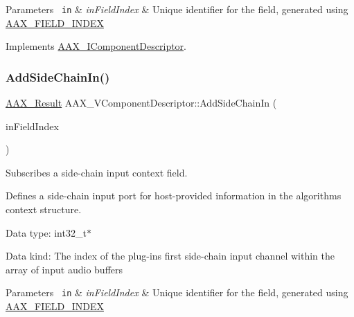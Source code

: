 \begin{DoxyParams}[1]{Parameters}
\mbox{\texttt{ in}}  & {\em in\+Field\+Index} & Unique identifier for the field, generated using \mbox{\hyperlink{a00392_acf807247ecd6e5899dc9dc31644e9a1d}{A\+A\+X\+\_\+\+F\+I\+E\+L\+D\+\_\+\+I\+N\+D\+EX}} \\
\hline
\end{DoxyParams}


Implements \mbox{\hyperlink{a01781_a59727dee1043fcd7f14da130ab254445}{A\+A\+X\+\_\+\+I\+Component\+Descriptor}}.

\mbox{\label{a01901_a9d3ad428d0b423e4aabba60eb76655c7}} 
\subsubsection{\texorpdfstring{AddSideChainIn()}{AddSideChainIn()}}
{\footnotesize\ttfamily \mbox{\hyperlink{a00392_a4d8f69a697df7f70c3a8e9b8ee130d2f}{A\+A\+X\+\_\+\+Result}} A\+A\+X\+\_\+\+V\+Component\+Descriptor\+::\+Add\+Side\+Chain\+In (\begin{DoxyParamCaption}\item[{\mbox{\hyperlink{a00392_ae807f8986143820cfb5d6da32165c9c7}{A\+A\+X\+\_\+\+C\+Field\+Index}}}]{in\+Field\+Index }\end{DoxyParamCaption})\hspace{0.3cm}{\ttfamily [virtual]}}



Subscribes a side-\/chain input context field. 

Defines a side-\/chain input port for host-\/provided information in the algorithm\textquotesingle{}s context structure.


\begin{DoxyItemize}
\item Data type\+: int32\+\_\+t$\ast$
\item Data kind\+: The index of the plug-\/in\textquotesingle{}s first side-\/chain input channel within the array of input audio buffers
\end{DoxyItemize}


\begin{DoxyParams}[1]{Parameters}
\mbox{\texttt{ in}}  & {\em in\+Field\+Index} & Unique identifier for the field, generated using \mbox{\hyperlink{a00392_acf807247ecd6e5899dc9dc31644e9a1d}{A\+A\+X\+\_\+\+F\+I\+E\+L\+D\+\_\+\+I\+N\+D\+EX}} \\
\hline
\end{DoxyParams}


